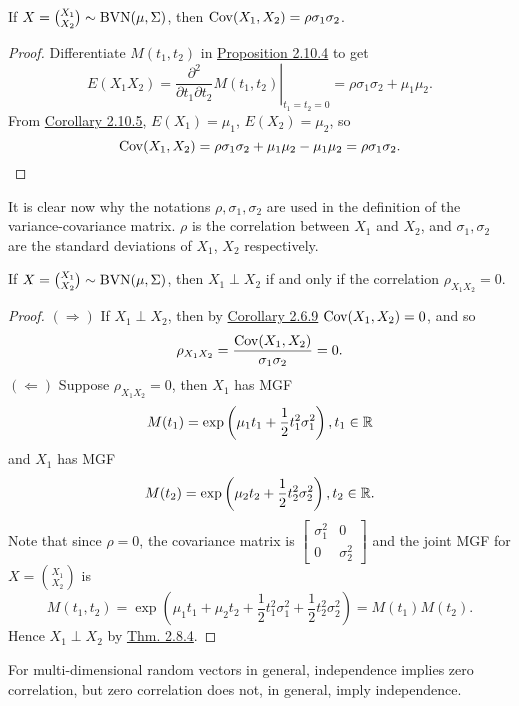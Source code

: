 \documentclass[11pt,fleqn]{book} %
\begin{document}
\begin{corollary} If \(X = \binom{X_1}{X_2} \sim \operatorname{BVN}(\mu, \Sigma)\), then \(\operatorname{Cov}(X_1, X_2) = \rho\sigma_1\sigma_2\).
\end{corollary}
\begin{proof} Differentiate \(M(t_1, t_2)\) in \hyperref[prop:2104]{Proposition 2.10.4} to get
\[
E(X_1X_2) = \left.\frac{\partial^2}{\partial t_1\partial t_2}M(t_1, t_2)\right|_{t_1 = t_2 = 0} = \rho\sigma_1\sigma_2 + \mu_1\mu_2.
\]
\indent From \hyperref[cor:2105]{Corollary 2.10.5}, \(E(X_1) = \mu_1\), \(E(X_2) = \mu_2\), so
\[
\operatorname{Cov}(X_1, X_2) = \rho\sigma_1\sigma_2 + \mu_1\mu_2 - \mu_1\mu_2 = \rho\sigma_1\sigma_2.
\]
\end{proof}

\begin{remark} It is clear now why the notations \(\rho, \sigma_1, \sigma_2\) are used in the definition of the variance-covariance matrix. \(\rho\) is the correlation between \(X_1\) and \(X_2\), and \(\sigma_1, \sigma_2\) are the standard deviations of \(X_1\), \(X_2\) respectively.
\end{remark}

\begin{corollary} If \(X = \binom{X_1}{X_2} \sim \operatorname{BVN}(\mu, \Sigma)\), then \(X_1 \perp X_2\) if and only if the correlation \(\rho_{X_1X_2} = 0\).
\end{corollary}
\begin{proof} \((\Rightarrow)\) If \(X_1 \perp X_2\), then by \hyperref[cor:269]{Corollary 2.6.9} \(\operatorname{Cov}(X_1, X_2) = 0\), and so
\[
\rho_{X_1X_2} = \frac{\operatorname{Cov}(X_1, X_2)}{\sigma_1\sigma_2} = 0.
\]
\((\Leftarrow)\) Suppose \(\rho_{X_1X_2} = 0\), then \(X_1\) has MGF
\[
M(t_1) = \exp\left(\mu_1t_1 + \frac12 t_1^2\sigma_1^2\right), t_1 \in \mathbb{R}
\]
and \(X_1\) has MGF
\[
M(t_2) = \exp\left(\mu_2t_2 + \frac12 t_2^2\sigma_2^2\right), t_2 \in \mathbb{R}.
\]
\indent Note that since \(\rho = 0\), the covariance matrix is \(\begin{bmatrix} \sigma_1^2 & 0 \\ 0 & \sigma_2^2\end{bmatrix}\) and the joint MGF for \(X = \binom{X_1}{X_2}\) is
\[
M(t_1, t_2) = \exp\left(\mu_1t_1 + \mu_2t_2 + \frac12 t_1^2\sigma_1^2 + \frac12 t_2^2\sigma_2^2\right) = M(t_1)M(t_2).
\]
\indent Hence \(X_1 \perp X_2\) by \hyperref[thm:284]{Thm. 2.8.4}.
\end{proof}

\begin{remark} For multi-dimensional random vectors in general, independence implies zero correlation, but zero correlation does not, in general, imply independence.
\end{remark}
\end{document}
